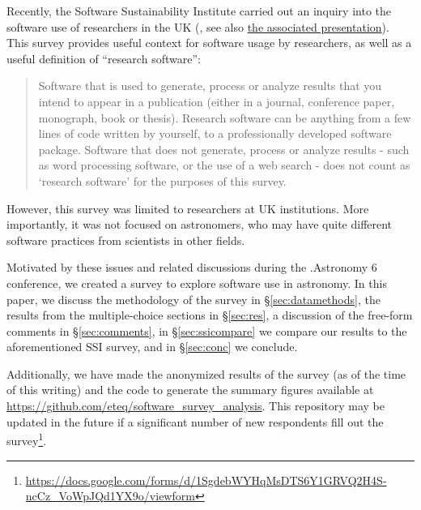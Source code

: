 Recently,  the Software Sustainability Institute carried out an inquiry into the software use of researchers in the UK  (\cite{f824cd98-b953-4c08-96c8-2533188bc4c4}, see also \href{http://wl.figshare.com/articles/1243288/embed?show_title=1}{the associated presentation}). This survey provides useful context for software usage by researchers, as well as a useful definition of ``research software'':
\begin{quote}
Software that is used to generate, process or analyze results that you intend to appear in a publication (either in a journal, conference paper, monograph, book or thesis). Research software can be anything from a few lines of code written by yourself, to a professionally developed software package. Software that does not generate, process or analyze results - such as word processing software, or the use of a web search - does not count as ‘research software’ for the purposes of this survey.
\end{quote}
However, this survey was limited to researchers at UK institutions.  More importantly, it was not focused on astronomers, who may have quite different software practices from scientists in other fields.

Motivated by these issues and related discussions during the .Astronomy 6 conference, we created a survey to explore software use in astronomy.  In this paper, we discuss the methodology of the survey in \S \ref{sec:datamethods}, the results from the multiple-choice sections in \S \ref{sec:res}, a discussion of the free-form comments in \S \ref{sec:comments}, in \S \ref{sec:ssicompare} we compare our results to the aforementioned SSI survey, and in \S \ref{sec:conc} we conclude.

Additionally, we have made the anonymized results of the survey (as of the time of this writing) and the code to generate the summary figures available at \url{https://github.com/eteq/software_survey_analysis}. This repository may be updated in the future if a significant number of new respondents fill out the survey\footnote{\url{https://docs.google.com/forms/d/1SgdebWYHqMsDTS6Y1GRVQ2H4S-ncCz_VoWpJQd1YX9o/viewform}}.
    